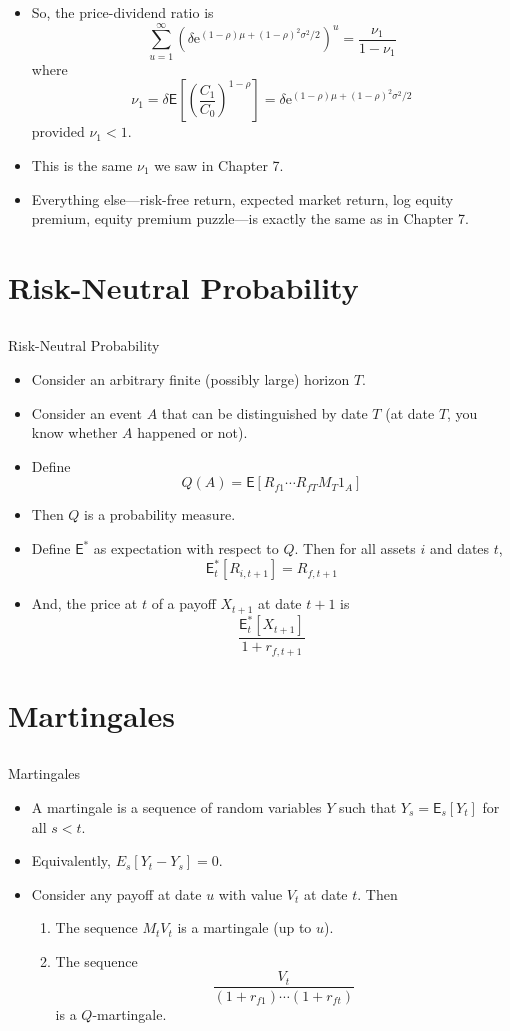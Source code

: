 \documentclass[10pt]{beamer}
\newcommand{\bi}{\begin{itemize}}
\newcommand{\ei}{\end{itemize}}
\newcommand{\im}{\item}
\newcommand{\E}{\mathrm{e}}
\newcommand{\mye}{\ensuremath{\mathsf{E}}}
\begin{document}
\begin{frame}[plain]
\bi 
\im 
So, the price-dividend ratio is
$$ \sum_{u=1}^\infty \left(\delta\E^{(1-\rho)\mu + (1-\rho)^2\sigma^2/2} \right)^u = \frac{\nu_1}{1-\nu_1}$$
where
$$\nu_1 = \delta \mye\left[\left(\frac{C_1}{C_0}\right)^{1-\rho}\right] = \delta\E^{(1-\rho)\mu + (1-\rho)^2\sigma^2/2}$$
provided $\nu_1<1$.  
\im 
This is the same $\nu_1$ we saw in Chapter 7.  
\im Everything else---risk-free return, expected market return, log equity premium, equity premium puzzle---is exactly the same as in Chapter 7.
\ei 
\end{frame}

\section{Risk-Neutral Probability}\subsection{}
\begin{frame}{Risk-Neutral Probability}
\bi \im Consider an arbitrary finite (possibly large) horizon $T$.  
\im Consider an event $A$ that can be distinguished by date $T$ (at date $T$, you know whether $A$ happened or not).
\im Define 
    $$Q(A) = \mye[R_{f1}\cdots R_{fT}M_T1_A]$$ 
\im Then $Q$ is a probability measure.
\im Define $\mye^*$ as expectation with respect to $Q$.  Then for all assets $i$ and dates $t$,
    $$\mye^*_t[R_{i,t+1}] = R_{f,t+1}$$
        \im And, the price at $t$ of a payoff $X_{t+1}$ at date $t+1$ is
    $$\frac{\mye^*_t[X_{t+1}]}{1+r_{f,t+1}}$$
    \ei 
\end{frame}

\section{Martingales}\subsection{}

\begin{frame}{Martingales}
    \bi 
    \im A martingale is a sequence of random variables $Y$ such that $Y_s = \mye_s[Y_t]$ for all $s<t$.
    \im Equivalently, $E_s[Y_t-Y_s] = 0$.
    \im Consider any payoff at date $u$ with value $V_t$ at date $t$.  Then
    \begin{enumerate}
        \im The sequence $M_tV_t$ is a martingale (up to $u$).
        \im The sequence
        $$\frac{V_t}{(1+r_{f1}) \cdots (1+r_{ft})}$$
        is a $Q$-martingale.
    \end{enumerate}
    \ei
 \end{frame}
\end{document}
